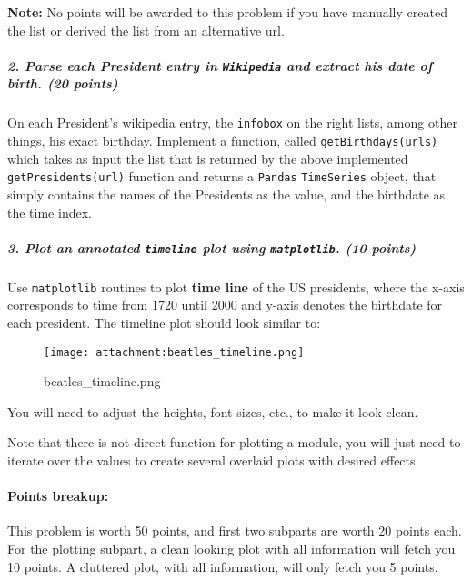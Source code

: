 \documentclass[11pt]{article}
\makeatletter
\def\maxwidth{\ifdim\Gin@nat@width>\linewidth\linewidth
    \else\Gin@nat@width\fi}
\let\Oldincludegraphics\includegraphics
\renewcommand{\includegraphics}[1]{\Oldincludegraphics[width=.8\maxwidth]{#1}}
\makeatother
\begin{document}
\textbf{Note:} No points will be awarded to this problem if you have
manually created the list or derived the list from an alternative url.

\subparagraph{\texorpdfstring{2. Parse each President entry in
\texttt{Wikipedia} and extract his date of birth. (20
points)}{2. Parse each President entry in Wikipedia and extract his date of birth. (20 points)}}\label{parse-each-president-entry-in-wikipedia-and-extract-his-date-of-birth.-20-points}

On each President's wikipedia entry, the \texttt{infobox} on the right
lists, among other things, his exact birthday. Implement a function,
called \texttt{getBirthdays(urls)} which takes as input the list that is
returned by the above implemented \texttt{getPresidents(url)} function
and returns a \texttt{Pandas} \texttt{TimeSeries} object, that simply
contains the names of the Presidents as the value, and the birthdate as
the time index.

\subparagraph{\texorpdfstring{3. Plot an annotated \texttt{timeline}
plot using \texttt{matplotlib}. (10
points)}{3. Plot an annotated timeline plot using matplotlib. (10 points)}}\label{plot-an-annotated-timeline-plot-using-matplotlib.-10-points}

Use \texttt{matplotlib} routines to plot \textbf{time line} of the US
presidents, where the x-axis corresponds to time from 1720 until 2000
and y-axis denotes the birthdate for each president. The timeline plot
should look similar to:

\begin{figure}
\centering
\texttt{[image: attachment:beatles\_timeline.png]}
\caption{beatles\_timeline.png}
\end{figure}

You will need to adjust the heights, font sizes, etc., to make it look
clean.

Note that there is not direct function for plotting a module, you will
just need to iterate over the values to create several overlaid plots
with desired effects.

\paragraph{Points breakup:}\label{points-breakup}

This problem is worth 50 points, and first two subparts are worth 20
points each. For the plotting subpart, a clean looking plot with all
information will fetch you 10 points. A cluttered plot, with all
information, will only fetch you 5 points.
\end{document}
